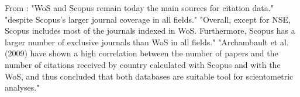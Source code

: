 From \parencite{mongeon2016journal_coverage_web_science_scopus} :
"WoS and Scopus remain today the main sources for citation data."
"despite Scopus's larger journal coverage in all fields."
"Overall, except for NSE, Scopus includes most of the journals indexed in WoS. Furthermore, Scopus has a larger number of exclusive journals than WoS in all fields."
"Archambault et al. (2009) have shown a high correlation between the number of papers and the number of citations received by country calculated with Scopus and with the WoS, and thus concluded that both databases are suitable tool for scientometric analyses."